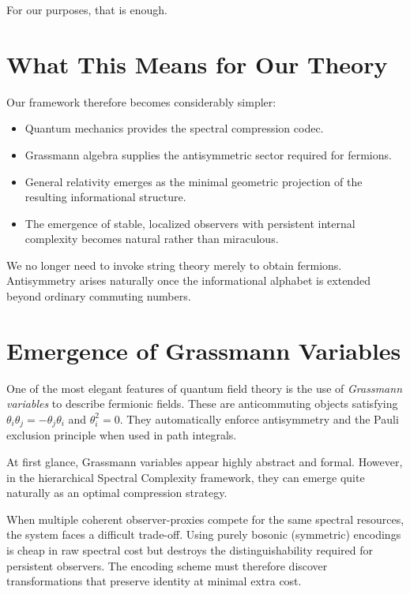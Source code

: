 For our purposes, that is enough.

\section{What This Means for Our Theory}

Our framework therefore becomes considerably simpler:

\begin{itemize}
\item Quantum mechanics provides the spectral compression codec.
\item Grassmann algebra supplies the antisymmetric sector required for fermions.
\item General relativity emerges as the minimal geometric projection of the resulting informational structure.
\item The emergence of stable, localized observers with persistent internal complexity becomes natural rather than miraculous.
\end{itemize}

We no longer need to invoke string theory merely to obtain fermions. Antisymmetry arises naturally once the informational alphabet is extended beyond ordinary commuting numbers.



\section{Emergence of Grassmann Variables}

One of the most elegant features of quantum field theory is the use of \emph{Grassmann variables} to describe fermionic fields. These are anticommuting objects satisfying $\theta_i \theta_j = -\theta_j \theta_i$ and $\theta_i^2 = 0$. They automatically enforce antisymmetry and the Pauli exclusion principle when used in path integrals.

At first glance, Grassmann variables appear highly abstract and formal. However, in the hierarchical Spectral Complexity framework, they can emerge quite naturally as an optimal compression strategy.

When multiple coherent observer-proxies compete for the same spectral resources, the system faces a difficult trade-off. Using purely bosonic (symmetric) encodings is cheap in raw spectral cost but destroys the distinguishability required for persistent observers. The encoding scheme must therefore discover transformations that preserve identity at minimal extra cost.

